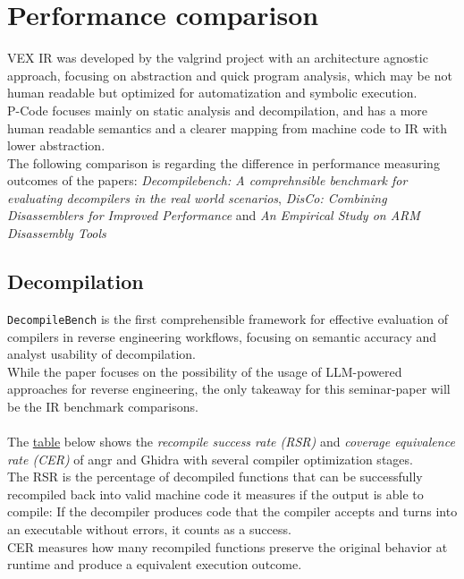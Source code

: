 \documentclass[seminar]{plai}
\begin{document}
\section{Performance comparison}
\label{sec:performance comparison}

VEX IR was developed by the valgrind project with an architecture agnostic approach, focusing on abstraction and quick program analysis, which may be not human readable but optimized for automatization and symbolic execution.\\
P-Code focuses mainly on static analysis and decompilation, and has a more human readable semantics and a clearer mapping from machine code to IR with lower abstraction.\\
The following comparison is regarding the difference in performance measuring outcomes of the papers:\textit{ Decompilebench: A comprehnsible benchmark for evaluating decompilers in the real world scenarios}\cite{decompileBench-comprehensice-benchmark-for-evaluating-decompilers-in-real-world-scenarios}, \textit{DisCo: Combining Disassemblers for Improved Performance}\cite{DisCo-combining-disassemblers-for-improved-performance} and \textit{An Empirical Study on ARM Disassembly Tools}\cite{an-empirical-study-on-ARM-disassembly-disassembly-tools}

\subsection{Decompilation}
\texttt{DecompileBench} is the first comprehensible framework for effective evaluation of compilers in reverse engineering workflows, focusing on semantic accuracy and analyst usability of decompilation.\\
While the paper focuses on the possibility of the usage of LLM-powered approaches for reverse engineering, the only takeaway for this seminar-paper will be the IR benchmark comparisons.\\
\\
The \hyperref[sec:decompileBench-comparison]{table} below shows the \textit{recompile success rate (RSR)} and \textit{coverage equivalence rate (CER)} of angr and Ghidra with several compiler optimization stages.\\
The RSR is the percentage of decompiled functions that can be successfully recompiled back into valid machine code it measures if the output is able to compile: If the decompiler produces code that the compiler accepts and turns into an executable without errors, it counts as a success.\\
CER measures how many recompiled functions preserve the original behavior at runtime and produce a equivalent execution outcome.
\end{document}
